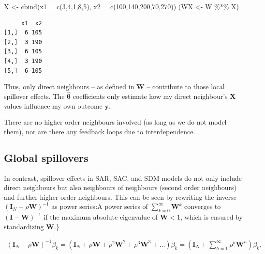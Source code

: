 \documentclass[
  letterpaper,
]{scrbook}
\newenvironment{Shaded}{\begin{snugshade}}{\end{snugshade}}
\newcommand{\AttributeTok}[1]{\textcolor[rgb]{0.40,0.45,0.13}{#1}}
\newcommand{\DecValTok}[1]{\textcolor[rgb]{0.68,0.00,0.00}{#1}}
\newcommand{\FunctionTok}[1]{\textcolor[rgb]{0.28,0.35,0.67}{#1}}
\newcommand{\NormalTok}[1]{\textcolor[rgb]{0.00,0.23,0.31}{#1}}
\newcommand{\OtherTok}[1]{\textcolor[rgb]{0.00,0.23,0.31}{#1}}
\newcommand{\SpecialCharTok}[1]{\textcolor[rgb]{0.37,0.37,0.37}{#1}}
\begin{document}
\begin{Shaded}
\begin{Highlighting}[]
\NormalTok{X }\OtherTok{\textless{}{-}} \FunctionTok{cbind}\NormalTok{(}\AttributeTok{x1 =} \FunctionTok{c}\NormalTok{(}\DecValTok{3}\NormalTok{,}\DecValTok{4}\NormalTok{,}\DecValTok{1}\NormalTok{,}\DecValTok{8}\NormalTok{,}\DecValTok{5}\NormalTok{),}
           \AttributeTok{x2 =} \FunctionTok{c}\NormalTok{(}\DecValTok{100}\NormalTok{,}\DecValTok{140}\NormalTok{,}\DecValTok{200}\NormalTok{,}\DecValTok{70}\NormalTok{,}\DecValTok{270}\NormalTok{))}
\NormalTok{(WX }\OtherTok{\textless{}{-}}\NormalTok{  W }\SpecialCharTok{\%*\%}\NormalTok{ X)}
\end{Highlighting}
\end{Shaded}

\begin{verbatim}
     x1  x2
[1,]  6 105
[2,]  3 190
[3,]  6 105
[4,]  3 190
[5,]  6 105
\end{verbatim}

Thus, only direct neighbours -- as defined in
\({\boldsymbol{\mathbf{W}}}\) -- contribute to those local spillover
effects. The \(\hat{\boldsymbol{\mathbf{\theta}}}\) coefficients only
estimate how my direct neighbour's \(\boldsymbol{\mathbf{X}}\) values
influence my own outcome \(\boldsymbol{\mathbf{y}}\).

There are no higher order neighbours involved (as long as we do not
model them), nor are there any feedback loops due to interdependence.

\hypertarget{global-spillovers}{%
\subsection{Global spillovers}\label{global-spillovers}}

In contrast, spillover effects in SAR, SAC, and SDM models do not only
include direct neighbours but also neighbours of neighbours (second
order neighbours) and further higher-order neighbours. This can be seen
by rewriting the inverse
\(({\boldsymbol{\mathbf{I}}_N}-\rho {\boldsymbol{\mathbf{W}}})^{-1}\) as
power series:A power series of
\(\sum\nolimits_{k=0}^\infty {\boldsymbol{\mathbf{W}}}^k\) converges to
\(({\boldsymbol{\mathbf{I}}}-{\boldsymbol{\mathbf{W}}})^{-1}\) if the
maximum absolute eigenvalue of \({\boldsymbol{\mathbf{W}}} < 1\), which
is ensured by standardizing \({\boldsymbol{\mathbf{W}}}\).\}

\[
\begin{split}
({\boldsymbol{\mathbf{I}}_N}-\rho {\boldsymbol{\mathbf{W}}})^{-1}\beta_k 
=({\boldsymbol{\mathbf{I}}_N} + \rho{\boldsymbol{\mathbf{W}}} + \rho^2{\boldsymbol{\mathbf{W}}}^2 + \rho^3{\boldsymbol{\mathbf{W}}}^3 + ...)\beta_k 
= ({\boldsymbol{\mathbf{I}}_N} + \sum_{h=1}^\infty \rho^h{\boldsymbol{\mathbf{W}}}^h)\beta_k ,
\end{split}
\]
\end{document}
